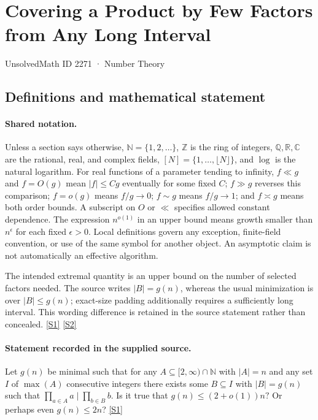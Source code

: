 \documentclass[11pt,a4paper]{article}
\newcommand{\N}{\mathbb{N}}
\newcommand{\Z}{\mathbb{Z}}
\newcommand{\Q}{\mathbb{Q}}
\newcommand{\R}{\mathbb{R}}
\newcommand{\C}{\mathbb{C}}
\newcommand{\sref}[2]{\hyperlink{source:#1:#2}{[S#2]}}
\begin{document}

\setcounter{section}{2270}

\section{Covering a Product by Few Factors from Any Long Interval}\label{2271}

{\small\sffamily UnsolvedMath ID 2271 · Number Theory}

\subsection{Definitions and mathematical statement}

\paragraph{Shared notation.}Unless a section says otherwise, $\N=\{1,2,\ldots\}$,
$\Z$ is the ring of integers, $\Q,\R,\C$ are the rational, real, and complex
fields, $[N]=\{1,\ldots,\lfloor N\rfloor\}$, and $\log$ is the natural
logarithm. For real functions of a parameter tending to infinity,
$f\ll g$ and $f=O(g)$ mean $|f|\leq Cg$ eventually for some fixed $C$;
$f\gg g$ reverses this comparison; $f=o(g)$ means $f/g\to0$;
$f\sim g$ means $f/g\to1$; and $f\asymp g$ means both order bounds.
A subscript on $O$ or $\ll$ specifies allowed constant dependence.
The expression $n^{o(1)}$ in an upper bound means growth smaller than
$n^\epsilon$ for each fixed $\epsilon>0$. Local definitions govern any
exception, finite-field convention, or use of the same symbol for another
object. An asymptotic claim is not automatically an effective algorithm.



The intended extremal quantity is an upper bound on the number of selected factors needed. The source writes $|B|=g(n)$, whereas the usual minimization is over $|B|\leq g(n)$; exact-size padding additionally requires a sufficiently long interval. This wording difference is retained in the source statement rather than concealed. \sref{2271}{1} \sref{2271}{2}

\paragraph{Statement recorded in the supplied source.}
Let $g(n)$ be minimal such that for any $A\subseteq [2,\infty)\cap \mathbb{N}$ with $\lvert A\rvert =n$ and any set $I$ of $\max(A)$ consecutive integers there exists some $B\subseteq I$ with $\lvert B\rvert=g(n)$ such that $ \prod_{a\in A} a \mid \prod_{b\in B}b. $ Is it true that $ g(n) \leq (2+o(1))n? $ Or perhaps even $g(n)\leq 2n$? \sref{2271}{1}
\end{document}
